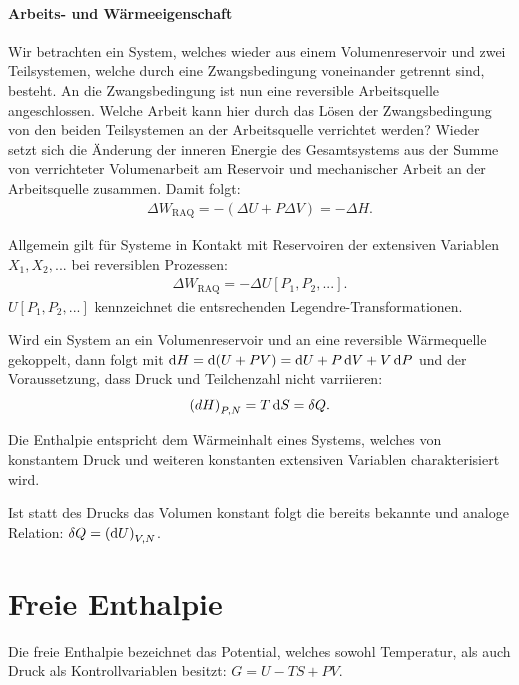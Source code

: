 \paragraph*{Arbeits- und Wärmeeigenschaft}
Wir betrachten ein System, welches wieder aus einem Volumenreservoir und zwei Teilsystemen, welche durch eine Zwangsbedingung voneinander getrennt sind, besteht. An die Zwangsbedingung ist nun eine reversible Arbeitsquelle angeschlossen. Welche Arbeit kann hier durch das Lösen der Zwangsbedingung von den beiden Teilsystemen an der Arbeitsquelle verrichtet werden? 
Wieder setzt sich die Änderung der inneren Energie des Gesamtsystems aus der Summe von verrichteter Volumenarbeit am Reservoir und mechanischer Arbeit an der Arbeitsquelle zusammen. Damit folgt:
\begin{align*}
    \Delta W_\mathrm{RAQ}=-(\Delta U+P\Delta V)=-\Delta H.
\end{align*}
\begin{formal}
    Allgemein gilt für Systeme in Kontakt mit Reservoiren der extensiven Variablen $X_1,X_2,...$ bei reversiblen Prozessen:
    \begin{align*}
        \Delta W_\mathrm{RAQ}= -\Delta U\left[P_1,P_2,...\right].
    \end{align*}
    $U\left[P_1,P_2,...\right]$ kennzeichnet die entsrechenden Legendre-Transformationen. 
\end{formal}
Wird ein System an ein Volumenreservoir und an eine reversible Wärmequelle gekoppelt, dann folgt mit $\mathop{}\!\mathrm{d} H=\mathop{}\!\mathrm{d}(U+PV)=\mathop{}\!\mathrm{d} U+P\mathop{}\!\mathrm{d} V+V\mathop{}\!\mathrm{d} P$ und der Voraussetzung, dass Druck und Teilchenzahl nicht varriieren:
\begin{align*}
    \left(dH\right)_{P,N}=T\mathop{}\!\mathrm{d} S= \mathop{}\!\delta Q.
\end{align*}
\begin{formal}
    Die Enthalpie entspricht dem Wärmeinhalt eines Systems, welches von konstantem Druck und weiteren konstanten extensiven Variablen charakterisiert wird.
\end{formal}
Ist statt des Drucks das Volumen konstant folgt die bereits bekannte und analoge Relation: $\mathop{}\!\delta Q=\left(\mathop{}\!\mathrm{d} U\right)_{V,N}$.

\section{Freie Enthalpie}
Die freie Enthalpie bezeichnet das Potential, welches sowohl Temperatur, als auch Druck als Kontrollvariablen besitzt: $G=U-TS+PV$.

